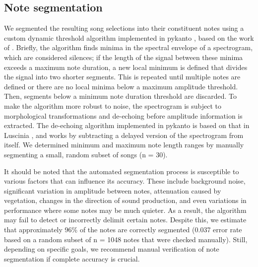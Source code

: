 \subsection{Note segmentation}

We segmented the resulting song selections into their constituent notes using a custom dynamic threshold algorithm implemented in pykanto \parencite{merinorecalde2023}, based on the work of \textcite{sainburg2019}. Briefly, the algorithm finds minima in the spectral envelope of a spectrogram, which are considered silences; if the length of the signal between these minima exceeds a maximum note duration, a new local minimum is defined that divides the signal into two shorter segments. This is repeated until multiple notes are defined or there are no local minima below a maximum amplitude threshold. Then, segments below a minimum note duration threshold are discarded. To make the algorithm more robust to noise, the spectrogram is subject to morphological transformations and de-echoing before amplitude information is extracted. The de-echoing algorithm implemented in pykanto is based on that in Luscinia \parencite{lachlan2016a}, and works by subtracting a delayed version of the spectrogram from itself. We determined minimum and maximum note length ranges by manually segmenting a small, random subset of songs (n = 30).

It should be noted that the automated segmentation process is susceptible to various factors that can influence its accuracy. These include background noise, significant variation in amplitude between notes, attenuation caused by vegetation, changes in the direction of sound production, and even variations in performance where some notes may be much quieter. As a result, the algorithm may fail to detect or incorrectly delimit certain notes. Despite this, we estimate that approximately 96\% of the notes are correctly segmented (0.037 error rate based on a random subset of n = 1048 notes that were checked manually). Still, depending on specific goals, we recommend manual verification of note segmentation if complete accuracy is crucial.

